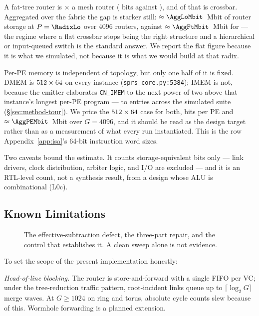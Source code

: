 \documentclass[journal,10pt]{IEEEtran}
\theoremstyle{plain}
\theoremstyle{definition}
\theoremstyle{remark}
\newcommand{\sv}[1]{\texttt{#1}}
\begin{document}
A fat-tree router is \RouterBlowup$\times$ a mesh router
(\RouterBitsFt{} bits against \RouterBitsLo{}), and \XbarShareFt{} of that
is crossbar. Aggregated over the fabric the gap is starker still:
$\approx \AggLoMbit$~Mbit of router storage at $P = \RadixLo$ over 4096
routers, against $\approx \AggFtMbit$~Mbit for \RadixMaxInst{} --- the
regime where a flat crossbar stops being the right structure and a
hierarchical or input-queued switch is the standard answer. We report the
flat figure because it is what we simulated, not because it is what we would
build at that radix.

Per-PE memory is independent of topology, but only one half of it is
fixed. DMEM is $512 \times 64$ on every instance
(\sv{sprs\_core.py:5384}); IMEM is not, because the emitter elaborates
\sv{CN\_IMEM} to the next power of two above that instance's longest per-PE
program --- \ImemDepthLo{} to \ImemDepthHi{} entries across the simulated
suite (\S\ref{sec:method-tour}). We price the $512 \times 64$ case
for both, \PerPEBits{} bits per PE and $\approx \AggPEMbit$~Mbit over $G =
4096$, and it should be read as the design target rather than as a
measurement of what every run instantiated. This is the row
Appendix~\ref{app:isa}'s 64-bit instruction word sizes.

Two caveats bound the estimate. It counts storage-equivalent bits only ---
link drivers, clock distribution, arbiter logic, and I/O are excluded --- and
it is an RTL-level count, not a synthesis result, from a design whose ALU is
combinational (L0c).

\subsection{Known Limitations}\label{sec:fabric-lim}

\begin{figure}[!t]\centering

\caption{The effective-subtraction defect, the three-part repair, and the control that establishes it. A clean sweep alone is not evidence.}\label{fig:fp64}
\end{figure}


To set the scope of the present implementation honestly:

\emph{Head-of-line blocking.} The router is store-and-forward with a
single FIFO per VC; under the tree-reduction traffic pattern,
root-incident links queue up to $\lceil \log_2 G\rceil$ merge waves.
At $G \geq 1024$ on ring and torus, absolute cycle counts slew because of
this. Wormhole forwarding is a planned extension.
\end{document}

